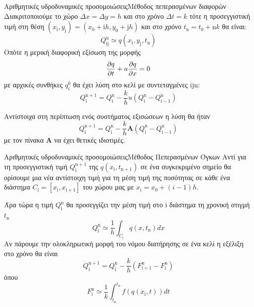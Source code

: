 \documentclass{beamer}
\begin{document}
\begin{frame}{Αριθμητικές υδροδυναμικές προσομοιώσεις}{Μέθοδος πεπερασμένων διαφορών}
	Διακριτοποιούμε το χώρο $\Delta x=\Delta y = h$ και στο χρόνο $\Delta t=k$ τότε η προσεγγιστική τιμή στη θέση $(x_\mathrm{i},y_\mathrm{j})=(x_0+\mathrm{i}h,y_0+\mathrm{j}h)$ και στο χρόνο $t_\mathrm{n}=t_0+\mathrm{n}k$ θα είναι:
	\begin{equation}
	Q_{\mathrm{ij}}^\mathrm{n }\simeq q(x_\mathrm{i},y_\mathrm{j},t_\mathrm{n})
	\end{equation}
	Οπότε η μερική διαφορική εξίσωση της μορφής
	\begin{equation}
	\pdv{q}{t}+u\pdv{q}{x}=0
	\end{equation} 
	με αρχικές συνθήκες $q_i^0$ θα έχει λύση στο κελί με συντεταγμένες $\mathrm{ijn}$:
	\begin{equation}
	Q_{\mathrm{i}}^\mathrm{n+1} = Q_{\mathrm{i}}^\mathrm{n} -\frac{k}{h} u \left( Q_\mathrm{i}^\mathrm{n} - Q_\mathrm{i-1}^\mathrm{n} \right)
	\end{equation} 
	
	Αντίστοιχα στη περίπτωση ενός συστήματος εξισώσεων η λύση θα ήταν
	\begin{equation}
	Q_{\mathrm{i}}^\mathrm{n+1} = Q_{\mathrm{i}}^\mathrm{n} -\frac{k}{h} \mathbf{Α} \left( Q_\mathrm{i}^\mathrm{n} - Q_\mathrm{i-1}^\mathrm{n} \right)
	\end{equation} 
	με τον πίνακα $\mathbf{Α}$ να έχει θετικές ιδιοτιμές. 
\end{frame}


\begin{frame}{Αριθμητικές υδροδυναμικές προσομοιώσεις}{Μέθοδος Πεπερασμένων Όγκων}
	Αντί για τη προσεγγιστική τιμή $Q_{\mathrm{i}}^\mathrm{n+1}$ της $q(x_\mathrm{i},t_\mathrm{n+1})$ σε ένα συγκεκριμένο σημείο θα ορίσουμε μια νέα αντίστοιχη τιμή για τη μέση τιμή της ποσότητας σε κάθε ένα διάστημα $C_\mathrm{i}=[x_\mathrm{i},x_\mathrm{i+1}]$ του χώρου μας με $x_\mathrm{i}=x_0+(i-1)h$. 
	
	Άρα τώρα η τιμή $Q_{\mathrm{i}}^\mathrm{n}$ θα προσεγγίζει την μέση τιμή στο $\mathrm{i}$ διάστημα τη χρονική στιγμή $t_\mathrm{n}$
	\begin{equation}
	Q_{\mathrm{i}}^\mathrm{n} \simeq \frac{1}{h} \int _{C_\mathrm{i}} q(x,t_\mathrm{n})dx
	\end{equation}
	Αν πάρουμε την ολοκληρωτική μορφή του νόμου διατήρησης σε ένα κελί η εξέλιξη στο χρόνο θα είναι
\begin{equation}
\label{eq:FVM}
Q_{\mathrm{i}}^\mathrm{n+1} = Q_{\mathrm{i}}^\mathrm{n} - \frac{k}{h}\left(F_{\mathrm{i+1}}^\mathrm{n}-F_{\mathrm{i}}^\mathrm{n} \right) 
\end{equation}
όπου 
\begin{equation}
F_{\mathrm{i}}^\mathrm{n} \simeq \frac{1}{k}\int_{t_\mathrm{n}}^{t_\mathrm{n}}f(q(x_\mathrm{i},t))dt 
\end{equation}
\end{frame}
\end{document}
